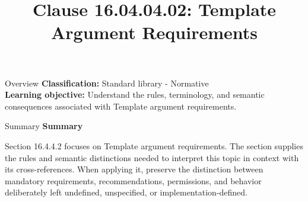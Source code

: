 \documentclass[10pt,letterpaper]{article}
\title{Clause 16.04.04.02: Template Argument Requirements}
\author{}
\date{}
\begin{document}
\maketitle
\begin{CornellOverviewBox}{Overview}
\textbf{Classification:} Standard library - Normative\\[2pt]
\textbf{Learning objective:} Understand the rules, terminology, and semantic consequences associated with Template argument requirements.
\end{CornellOverviewBox}\begin{CornellSummaryBox}{Summary}
{\sffamily\bfseries\color{Accent} Summary}\par\vspace{3pt}Section 16.4.4.2 focuses on Template argument requirements. The section supplies the rules and semantic distinctions needed to interpret this topic in context with its cross-references. When applying it, preserve the distinction between mandatory requirements, recommendations, permissions, and behavior deliberately left undefined, unspecified, or implementation-defined.
\end{CornellSummaryBox}
\end{document}
